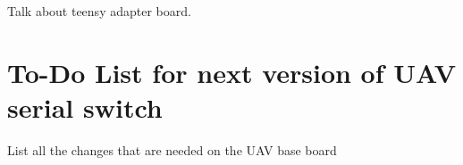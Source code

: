 %
Talk about teensy adapter board.
%
\section{To-Do List for next version of UAV serial switch}%
%
List all the changes that are needed on the UAV base board
